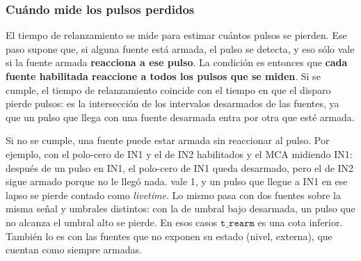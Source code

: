 \subsubsection{Cuándo mide los pulsos perdidos}

El tiempo de relanzamiento se mide para estimar cuántos pulsos se pierden. Ese
paso supone que, si alguna fuente está armada, el pulso se detecta, y eso sólo
vale si la fuente armada \textbf{reacciona a ese pulso}. La condición es
entonces que \textbf{cada fuente habilitada reaccione a todos los pulsos que se
miden}. Si se cumple, el tiempo de relanzamiento coincide con el tiempo en que
el disparo pierde pulsos: es la intersección de los intervalos desarmados de las
fuentes, ya que un pulso que llega con una fuente desarmada entra por otra que
esté armada.

Si no se cumple, una fuente puede estar armada sin reaccionar al pulso. Por
ejemplo, con el polo-cero de IN1 y el de IN2 habilitados y el MCA midiendo IN1:
después de un pulso en IN1, el polo-cero de IN1 queda desarmado, pero el de IN2
sigue armado porque no le llegó nada.  vale 1, y un pulso que
llegue a IN1 en ese lapso se pierde contado como \emph{livetime}. Lo mismo pasa con dos
fuentes sobre la misma señal y umbrales distintos: con la de umbral bajo
desarmada, un pulso que no alcanza el umbral alto se pierde. En esos casos
$\mathtt{t\_rearm}$ es una cota inferior. También lo es con las fuentes que no
exponen su estado (nivel, externa), que cuentan como siempre armadas.

\bibliografiacapitulo

